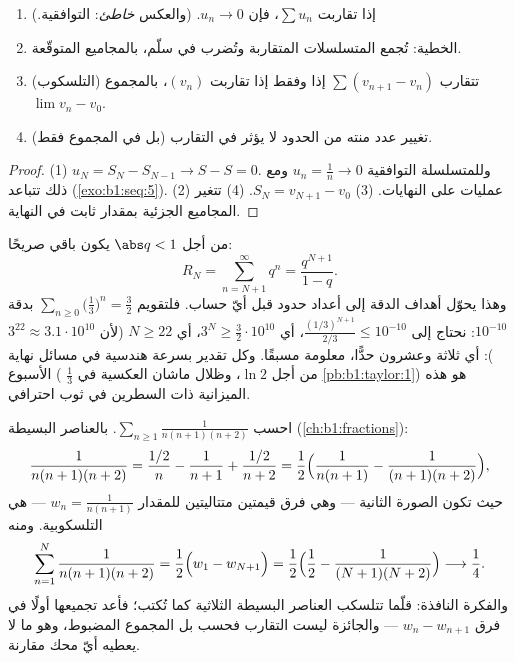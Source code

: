\begin{proposition}\label{prop:b1:series:first}
\begin{enumerate}
  \item إذا تقاربت $\sum u_n$، فإن $u_n \to 0$. (والعكس
        \emph{خاطئ}:  التوافقية.)
  \item الخطية: تُجمع المتسلسلات المتقاربة وتُضرب في سلّم، بالمجاميع
        المتوقّعة.
  \item (التلسكوب) تتقارب $\sum (v_{n+1} -
        v_n)$ إذا وفقط إذا تقاربت $(v_n)$، بالمجموع $\lim v_n -
        v_0$.
  \item تغيير عدد منته من الحدود لا يؤثر في التقارب
        (بل في المجموع فقط).
\end{enumerate}
\end{proposition}

\begin{proof}
(1) $u_N = S_N - S_{N-1} \to S - S = 0$. وللمتسلسلة التوافقية
$u_n = \frac1n \to 0$ ومع ذلك تتباعد (\cref{exo:b1:seq:5}). (2)
عمليات على النهايات. (3) $S_N = v_{N+1} - v_0$. (4) تتغير المجاميع
الجزئية بمقدار ثابت في النهاية.
\end{proof}

\begin{example}\label{ex:b1:series:georemainder}
من أجل $\abs q < 1$ يكون باقي 
صريحًا:
\[
R_N = \sum_{n = N+1}^{\infty} q^n = \frac{q^{N+1}}{1 - q} .
\]
وهذا يحوّل أهداف الدقة إلى أعداد حدود قبل أيّ
حساب. فلتقويم $\sum_{n\geq0} \bigl(\frac13\bigr)^n =
\frac32$ بدقة $10^{-10}$: نحتاج إلى $\frac{(1/3)^{N+1}}{2/3} \leq
10^{-10}$، أي $3^{N} \geq \frac{3}{2}\cdot 10^{10}$، أي $N
\geq 22$ (لأن $3^{22} \approx 3.1\cdot10^{10}$): أي ثلاثة وعشرون
حدًّا، معلومة مسبقًا. وكل تقدير بسرعة هندسية في
مسائل نهاية الأسبوع ( $\frac13$ من أجل $\ln 2$، وظلال ماشان
العكسية في \cref{pb:b1:taylor:1}) هو هذه الميزانية ذات السطرين
في ثوب احترافي.
\end{example}

\begin{example}\label{ex:b1:series:telescope3}
احسب $\sum_{n\geq1} \frac{1}{n(n+1)(n+2)}$. بالعناصر
البسيطة (\cref{ch:b1:fractions}):
\[
\frac{1}{n(n+1)(n+2)}
= \frac{1/2}{n} - \frac{1}{n+1} + \frac{1/2}{n+2}
= \frac12\Bigl(\frac{1}{n(n+1)} - \frac{1}{(n+1)(n+2)}\Bigr),
\]
حيث تكون الصورة الثانية --- وهي فرق قيمتين متتاليتين للمقدار
$w_n = \frac{1}{n(n+1)}$ --- هي التلسكوبية. ومنه
\[
\sum_{n=1}^{N} \frac{1}{n(n+1)(n+2)}
= \frac12\Bigl(w_1 - w_{N+1}\Bigr)
= \frac12\Bigl(\frac12 - \frac{1}{(N+1)(N+2)}\Bigr)
\longrightarrow \frac14 .
\]
والفكرة النافذة: قلّما تتلسكب العناصر البسيطة الثلاثية
كما تُكتب؛ فأعد تجميعها أولًا في فرق $w_n -
w_{n+1}$ --- والجائزة ليست التقارب فحسب بل
المجموع المضبوط، وهو ما لا يعطيه أيّ محك مقارنة.
\end{example}

